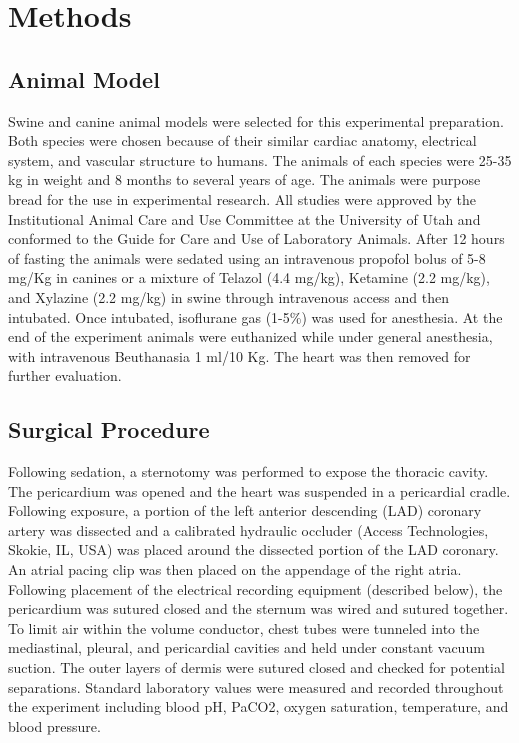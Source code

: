 \documentclass[twocolumn]{cinc}
\begin{document}
%


\section{Methods}

\subsection{Animal Model} 

Swine and canine animal models were selected for this experimental preparation. Both species were chosen because of their similar cardiac anatomy, electrical system, and vascular structure to humans. The animals of each species were 25-35 kg in weight and 8 months to several years of age. The animals were purpose bread for the use in experimental research. All studies were approved by the Institutional Animal Care and Use Committee at the University of Utah and conformed to the Guide for Care and Use of Laboratory Animals. After 12 hours of fasting the animals were sedated using an intravenous propofol bolus of 5-8 mg/Kg in canines or a mixture of Telazol (4.4 mg/kg), Ketamine (2.2 mg/kg), and Xylazine (2.2 mg/kg) in swine through intravenous access and then intubated. Once intubated, isoflurane gas (1-5\%) was used for anesthesia. At the end of the experiment animals were euthanized while under general anesthesia, with intravenous Beuthanasia 1 ml/10 Kg. The heart was then removed for further evaluation.

\subsection{Surgical Procedure}

Following sedation, a sternotomy was performed to expose the thoracic cavity. The pericardium was opened and the heart was suspended in a pericardial cradle. Following exposure, a portion of the left anterior descending (LAD) coronary artery was dissected and a calibrated hydraulic occluder (Access Technologies, Skokie, IL, USA) was placed around the dissected portion of the LAD coronary. An atrial pacing clip was then placed on the appendage of the right atria. Following placement of the electrical recording equipment (described below), the pericardium was sutured closed and the sternum was wired and sutured together. To limit air within the volume conductor, chest tubes were tunneled into the mediastinal, pleural, and pericardial cavities and held under constant vacuum suction. The outer layers of dermis were sutured closed and checked for potential separations. Standard laboratory values were measured and recorded throughout the experiment including blood pH, PaCO2, oxygen saturation, temperature, and blood pressure.  
\end{document}
